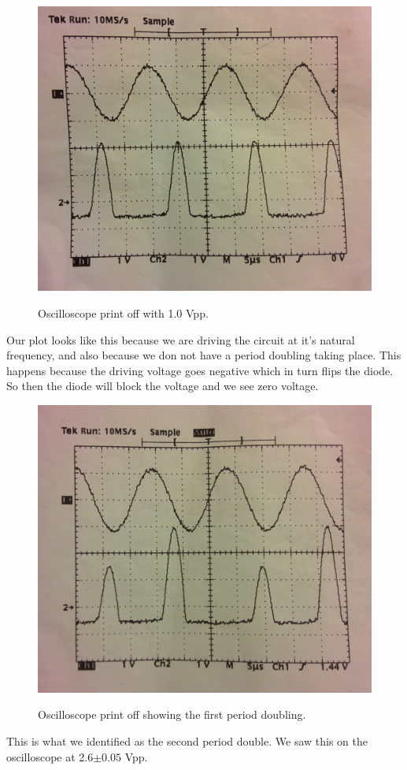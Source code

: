 \documentclass[12pt letterpaper]{article}
\begin{document}
\begin{figure}[H]
  \caption{Oscilloscope print off with 1.0 Vpp. }
  \centering
    \includegraphics[width=.60\textwidth]{normal_diode.jpg}
    \label{fig:normal}
\end{figure}

Our plot looks like this because we are driving the circuit at it's natural frequency, and also because we don not have a period doubling taking place. This happens because the driving voltage goes negative which in turn flips the diode. So then the diode will block the voltage and we see zero voltage. 


\begin{figure}[H]
  \caption{Oscilloscope print off showing the first period doubling.}
  \centering
    \includegraphics[width=.60\textwidth]{first_doubling.jpg}
    \label{fig:first}
\end{figure}

This is what we identified as the second period double. We saw this on the oscilloscope at 2.6$\pm0.05$ Vpp. 
\end{document}
